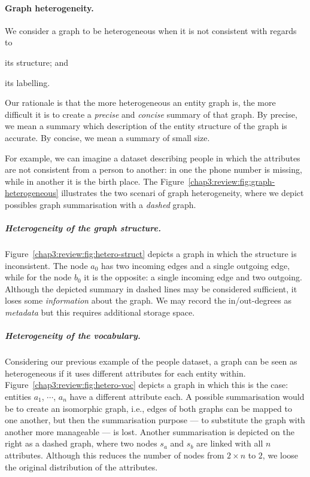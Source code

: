 \paragraph{Graph heterogeneity.}

We consider a graph to be heterogeneous when it is not consistent with regards to
\begin{inparaenum}[(a)]
\item its structure; and
\item its labelling.
\end{inparaenum}
Our rationale is that the more heterogeneous an entity graph is, the more difficult it is to create a \emph{precise} and \emph{concise} summary of that graph. By precise, we mean a summary which description of the entity structure of the graph is accurate. By concise, we mean a summary of small size.

For example, we can imagine a dataset describing people in which the attributes are not consistent from a person to another: in one the phone number is missing, while in another it is the birth place. The Figure~\ref{chap3:review:fig:graph-heterogeneous} illustrates the two scenari of graph heterogeneity, where we depict possibles graph summarisation with a \textit{dashed} graph.

\subparagraph{Heterogeneity of the graph structure.}

Figure~\ref{chap3:review:fig:hetero-struct} depicts a graph in which the structure is inconsistent. The node $a_0$ has two incoming edges and a single outgoing edge, while for the node $b_0$ it is the opposite: a single incoming edge and two outgoing. Although the depicted summary in dashed lines may be considered sufficient, it loses some \emph{information} about the graph. We may record the in/out-degrees as \emph{metadata} but this requires additional storage space.

\subparagraph{Heterogeneity of the vocabulary.}

Considering our previous example of the people dataset, a graph can be seen as heterogeneous if it uses different attributes for each entity within. Figure~\ref{chap3:review:fig:hetero-voc} depicts a graph in which this is the case: entities $a_1$, $\cdots$, $a_n$ have a different attribute each. A possible summarisation would be to create an isomorphic graph, i.e., edges of both graphs can be mapped to one another, but then the summarisation purpose --- to substitute the graph with another more manageable --- is lost. Another summarisation is depicted on the right as a dashed graph, where two nodes $s_a$ and $s_b$ are linked with all $n$ attributes. Although this reduces the number of nodes from $2 \times n$ to $2$, we loose the original distribution of the attributes.\\

